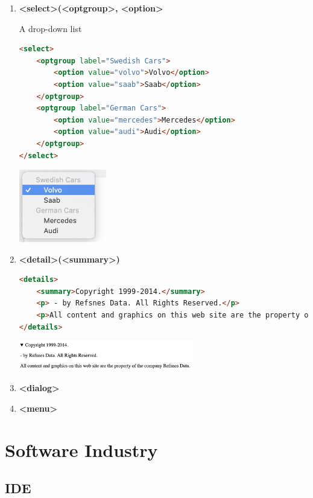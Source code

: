 \documentclass[12pt, a4paper]{report}
\begin{document}
\begin{enumerate}
        \item \textbf{<select>(<optgroup>, <option>} \par 
        A drop-down list 
        \begin{lstlisting}[language=HTML]
<select>
    <optgroup label="Swedish Cars">
        <option value="volvo">Volvo</option>
        <option value="saab">Saab</option>
    </optgroup>
    <optgroup label="German Cars">
        <option value="mercedes">Mercedes</option>
        <option value="audi">Audi</option>
    </optgroup>
</select>
        \end{lstlisting}
        \includegraphics[width=0.3\textwidth]{imgs/html_select.png}
        
        \item \textbf{<detail>(<summary>)}
        \begin{lstlisting}[language=HTML]
<details>
    <summary>Copyright 1999-2014.</summary>
    <p> - by Refsnes Data. All Rights Reserved.</p>
    <p>All content and graphics on this web site are the property of the company Refsnes Data.</p>
</details>
        \end{lstlisting}
        \includegraphics[width=0.6\textwidth]{imgs/html_detail.png}
        
        \item \textbf{<dialog>}
        
        \item \textbf{<menu>}
        
        
        
    \end{enumerate}





\chapter{Software Industry}
\section{IDE}
\end{document}
